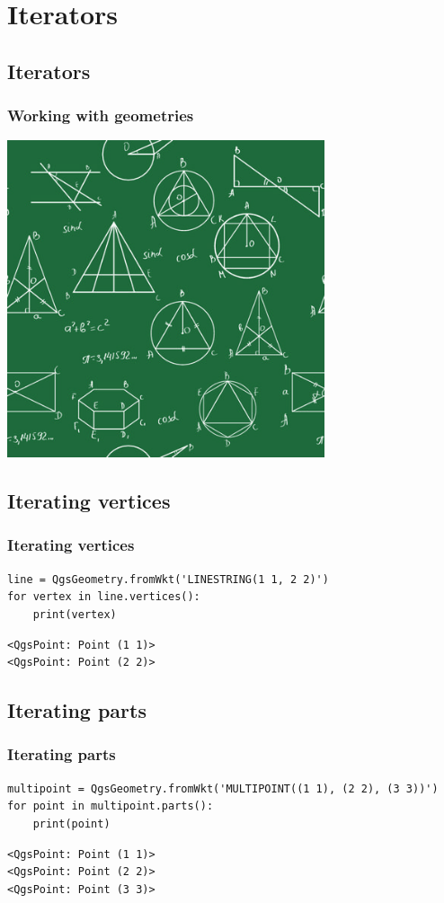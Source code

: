 \section{Iterators}

\subsection{Iterators}

\begin{frame}
\frametitle{Working with geometries}
	\includegraphics[width=0.7\textwidth]{img/geometries.jpg}
\end{frame}

\subsection{Iterating vertices}
\begin{frame}[fragile]
\frametitle{Iterating vertices}

\begin{lstlisting}[style=pythoncode]
line = QgsGeometry.fromWkt('LINESTRING(1 1, 2 2)')
for vertex in line.vertices():
	print(vertex)
\end{lstlisting}
\pause
\begin{lstlisting}[style=pythonoutput]
<QgsPoint: Point (1 1)>
<QgsPoint: Point (2 2)>
\end{lstlisting}

\end{frame}

\subsection{Iterating parts}
\begin{frame}[fragile]
\frametitle{Iterating parts}

\begin{lstlisting}[style=pythoncode]
multipoint = QgsGeometry.fromWkt('MULTIPOINT((1 1), (2 2), (3 3))')
for point in multipoint.parts():
	print(point)
\end{lstlisting}
\pause
\begin{lstlisting}[style=pythonoutput]
<QgsPoint: Point (1 1)>
<QgsPoint: Point (2 2)>
<QgsPoint: Point (3 3)>
\end{lstlisting}

\end{frame}
